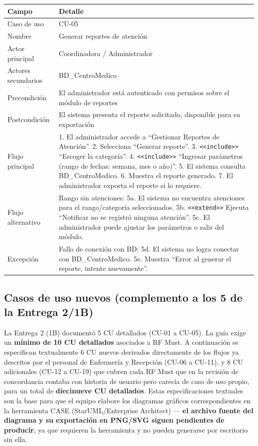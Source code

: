 \documentclass[11pt,a4paper]{article}
\begin{document}
	\begin{longtable}{p{} p{} }
		
		
		\toprule
		\textbf{Campo} &
		\textbf{Detalle}  \\
		\midrule
		\endhead
		
		Caso de uso & CU-05 \\
		Nombre & Generar reportes de atención \\
		Actor principal & Coordinadora / Administrador \\
		Actores secundarios & BD\_CentroMedico \\
		Precondición & El administrador está autenticado con permisos sobre el módulo de reportes \\
		Postcondición & El sistema presenta el reporte solicitado, disponible para su exportación \\
		Flujo principal & 1. El administrador accede a ``Gestionar Reportes de Atención''. 2. Selecciona ``Generar reporte''. 3. \texttt{<<include>>} ``Escoger la categoría''. 4. \texttt{<<include>>} ``Ingresar parámetros (rango de fechas: semana, mes o año)''. 5. El sistema consulta BD\_CentroMedico. 6. Muestra el reporte generado. 7. El administrador exporta el reporte si lo requiere. \\
		Flujo alternativo & Rango sin atenciones: 5a. El sistema no encuentra atenciones para el rango/categoría seleccionados. 5b. \texttt{<<extend>>} Ejecuta ``Notificar no se registró ninguna atención''. 5c. El administrador puede ajustar los parámetros o salir del módulo. \\
		Excepción & Fallo de conexión con BD: 5d. El sistema no logra conectar con BD\_CentroMedico. 5e. Muestra ``Error al generar el reporte, intente nuevamente''. \\
		
		\bottomrule
	\end{longtable}
	
	
	\subsection{ Casos de uso nuevos (complemento a los 5 de la Entrega 2/1B)}
	
	La Entrega 2 (1B) documentó 5 CU detallados (CU-01 a CU-05). La guía exige un \textbf{mínimo de 10 CU detallados} asociados a RF Must. A continuación se especifican textualmente 6 CU nuevos derivados directamente de los flujos ya descritos por el personal de Enfermería y Recepción (CU-06 a CU-11), y 8 CU adicionales (CU-12 a CU-19) que cubren cada RF Must que en la revisión de concordancia contaba con historia de usuario pero carecía de caso de uso propio, para un total de \textbf{diecinueve CU detallados}. Estas especificaciones textuales son la base para que el equipo elabore los diagramas gráficos correspondientes en la herramienta CASE (StarUML/Enterprise Architect) --- \textbf{el archivo fuente del diagrama y su exportación en PNG/SVG siguen pendientes de producir}, ya que requieren la herramienta y no pueden generarse por escritorio sin ella.
	
\end{document}
